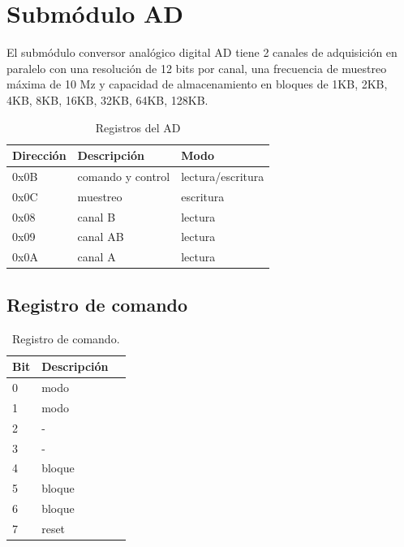 \section{Subm\'odulo AD}

El subm\'odulo conversor anal\'ogico digital AD tiene 2 canales de adquisici\'on en paralelo
con una resoluci\'on de 12 bits por canal, una frecuencia de muestreo m\'axima de 10 Mz 
y capacidad de almacenamiento en bloques de 1KB, 2KB, 4KB, 8KB, 16KB, 32KB, 64KB, 128KB.

\begin{table}[ht]
    \centering
    \begin{tabular}{|l|l|l|}
    \hline
     Direcci\'on   & Descripci\'on   & Modo\\
    \hline
     0x0B        & comando y control & lectura/escritura\\ 
    \hline
     0x0C        & muestreo          & escritura\\
     \hline
     0x08        & canal B           &lectura   \\
     \hline
     0x09        & canal AB          &lectura   \\
     \hline
     0x0A        & canal A           &lectura   \\
     \hline
\end{tabular}
\caption{\label{tab:registros_ad} Registros del AD}
\end{table}

\subsection{Registro de comando}
\begin{table}[ht]
    \centering
    \begin{tabular}{|l|l|l|}
    \hline
    Bit    & Descripci\'on \\
    \hline
     0 & modo\\ 
    \hline
     1 & modo\\
     \hline
     2 & - \\
     \hline
     3 & - \\
     \hline
     4 & bloque \\
     \hline
     5 & bloque \\
     \hline
     6 & bloque \\
     \hline
     7 & reset \\
     \hline
\end{tabular}
\caption{\label{tab:registros_ad_cmd}Registro de comando.}
\end{table}


